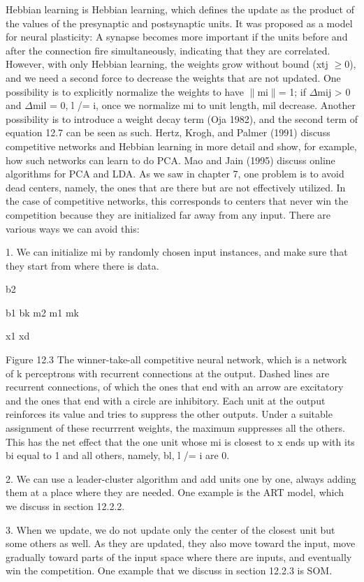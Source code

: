 Hebbian learning is Hebbian learning, which defines the update as the product of the values of the presynaptic and postsynaptic units. It was proposed as a model for neural plasticity: A synapse becomes more important if the units before and after the connection fire simultaneously, indicating that they are correlated. However, with only Hebbian learning, the weights grow without bound (xtj $\geq$0), and we need a second force to decrease the weights that are not updated. One possibility is to explicitly normalize the weights to have $\parallel$mi$\parallel$= 1; if $\Delta$mij > 0 and $\Delta$mil = 0, l /= i, once we normalize mi to unit length, mil decrease. Another possibility is to introduce a weight decay term (Oja 1982), and the second term of equation 12.7 can be seen as such. Hertz, Krogh, and Palmer (1991) discuss competitive networks and Hebbian learning in more detail and show, for example, how such networks can learn to do PCA. Mao and Jain (1995) discuss online algorithms for PCA and LDA. As we saw in chapter 7, one problem is to avoid dead centers, namely, the ones that are there but are not effectively utilized. In the case of competitive networks, this corresponds to centers that never win the competition because they are initialized far away from any input. There are various ways we can avoid this:

1. We can initialize mi by randomly chosen input instances, and make sure that they start from where there is data.

b2

b1 bk m2 m1 mk

x1 xd

Figure 12.3 The winner-take-all competitive neural network, which is a network of k perceptrons with recurrent connections at the output. Dashed lines are recurrent connections, of which the ones that end with an arrow are excitatory and the ones that end with a circle are inhibitory. Each unit at the output reinforces its value and tries to suppress the other outputs. Under a suitable assignment of these recurrrent weights, the maximum suppresses all the others. This has the net effect that the one unit whose mi is closest to x ends up with its bi equal to 1 and all others, namely, bl, l /= i are 0.

2. We can use a leader-cluster algorithm and add units one by one, always adding them at a place where they are needed. One example is the ART model, which we discuss in section 12.2.2.

3. When we update, we do not update only the center of the closest unit but some others as well. As they are updated, they also move toward the input, move gradually toward parts of the input space where there are inputs, and eventually win the competition. One example that we discuss in section 12.2.3 is SOM.

